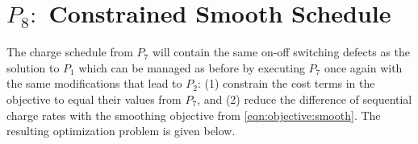 \section{$P_8:$ Constrained Smooth Schedule\label{sec:constrainedSmoothSchedule}}
 \par The charge schedule from $P_7$ will contain the same on-off switching defects as the solution to $P_1$ which can be managed as before by executing $P_7$ once again with the same modifications that lead to $P_2$: (1) constrain the cost terms in the objective to equal their values from $P_7$, and (2) reduce the difference of sequential charge rates with the smoothing objective from \ref{eqn:objective:smooth}.  The resulting optimization problem is given below.\\[0.1in] 
